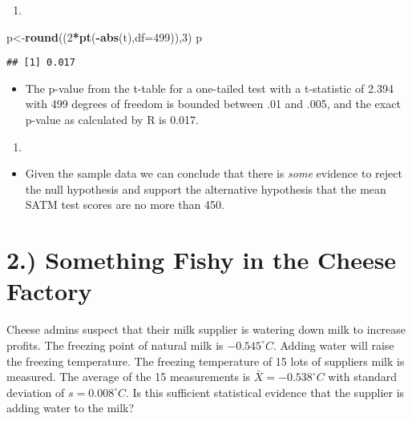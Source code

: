 \documentclass[]{article}
\newenvironment{Shaded}{\begin{snugshade}}{\end{snugshade}}
\newcommand{\KeywordTok}[1]{\textcolor[rgb]{0.13,0.29,0.53}{\textbf{#1}}}
\newcommand{\DataTypeTok}[1]{\textcolor[rgb]{0.13,0.29,0.53}{#1}}
\newcommand{\DecValTok}[1]{\textcolor[rgb]{0.00,0.00,0.81}{#1}}
\newcommand{\OperatorTok}[1]{\textcolor[rgb]{0.81,0.36,0.00}{\textbf{#1}}}
\newcommand{\NormalTok}[1]{#1}
\providecommand{\tightlist}{%
  \setlength{\itemsep}{0pt}\setlength{\parskip}{0pt}}
\begin{document}
\begin{enumerate}
\def\labelenumi{(\alph{enumi})}
\setcounter{enumi}{2}
\item
\end{enumerate}

\begin{Shaded}
\begin{Highlighting}[]
\NormalTok{p<-}\KeywordTok{round}\NormalTok{((}\DecValTok{2}\OperatorTok{*}\KeywordTok{pt}\NormalTok{(}\OperatorTok{-}\KeywordTok{abs}\NormalTok{(t),}\DataTypeTok{df=}\DecValTok{499}\NormalTok{)),}\DecValTok{3}\NormalTok{)}
\NormalTok{p}
\end{Highlighting}
\end{Shaded}

\begin{verbatim}
## [1] 0.017
\end{verbatim}

\begin{itemize}
\tightlist
\item
  The p-value from the t-table for a one-tailed test with a t-statistic
  of 2.394 with 499 degrees of freedom is bounded between .01 and .005,
  and the exact p-value as calculated by R is 0.017.
\end{itemize}

\begin{enumerate}
\def\labelenumi{(\alph{enumi})}
\setcounter{enumi}{3}
\item
\end{enumerate}

\begin{itemize}
\tightlist
\item
  Given the sample data we can conclude that there is \emph{some}
  evidence to reject the null hypothesis and support the alternative
  hypothesis that the mean SATM test scores are no more than 450.
\end{itemize}

\section{2.) Something Fishy in the Cheese
Factory}\label{something-fishy-in-the-cheese-factory}

Cheese admins suspect that their milk supplier is watering down milk to
increase profits. The freezing point of natural milk is
\(-0.545^{\circ}C\). Adding water will raise the freezing temperature.
The freezing temperature of 15 lots of suppliers milk is measured. The
average of the 15 measurements is \(\bar{X} = -0.538^{\circ}C\) with
standard deviation of \(s = 0.008^{\circ}C\). Is this sufficient
statistical evidence that the supplier is adding water to the milk?
\end{document}
